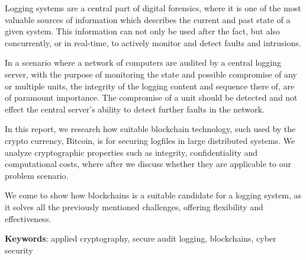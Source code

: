 
Logging systems are a central part of digital forensics, where it is
one of the most valuable sources of information which describes the
current and past state of a given system. This information can not
only be used after the fact, but also concurrently, or in real-time,
to actively monitor and detect faults and intrusions.

In a scenario where a network of computers are audited by a central
logging server, with the purpose of monitoring the state and possible
compromise of any or multiple units, the integrity of the logging
content and sequence there of, are of paramount importance. The
compromise of a unit should be detected and not effect the central
server's ability to detect further faults in the network.

In this report, we research how suitable blockchain technology, such
used by the crypto currency, Bitcoin, is for securing logfiles in
large distributed systems. We analyze cryptographic properties such as
integrity, confidentiality and computational costs, where after we
discuss whether they are applicable to our problem scenario.

We come to show how blockchains is a suitable candidate for a logging
system, as it solves all the previously mentioned challenges, offering
flexibility and effectiveness.

\textbf{Keywords}: applied cryptography, secure audit logging,
blockchains, cyber security
